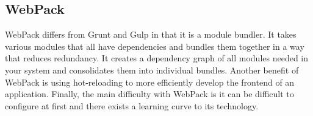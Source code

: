 \documentclass[draftclsnofoot,onecolumn,letterpaper,10pt,compsoc]{IEEEtran}
\begin{document}
	\subsection{WebPack}
        WebPack differs from Grunt and Gulp in that it is a module bundler. 
        It takes various modules that all have dependencies and bundles them together in a way that reduces redundancy\cite{WebPack}. 
        It creates a dependency graph of all modules needed in your system and consolidates them into individual bundles\cite{WebPack}.
        Another benefit of WebPack is using hot-reloading to more efficiently develop the frontend of an application\cite{TaskRunners}.
        Finally, the main difficulty with WebPack is it can be difficult to configure at first and there exists a learning curve to its technology\cite{TaskRunners}.

{}

\end{document}
